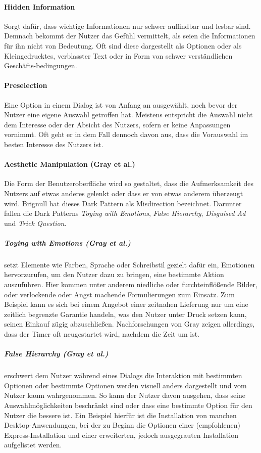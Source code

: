 \documentclass[a4paper]{article}
\newcommand{\todo}[1]{{\color{purple}{#1}}}
\begin{document}
\paragraph{Hidden Information}
Sorgt dafür, dass wichtige Informationen nur schwer auffindbar und lesbar sind. Demnach bekommt der Nutzer das Gefühl vermittelt, als seien die Informationen für ihn nicht von Bedeutung. Oft sind diese dargestellt als Optionen oder als Kleingedrucktes, verblasster Text oder in Form von schwer verständlichen Geschäfts-bedingungen.

\paragraph{Preselection}
Eine Option in einem Dialog ist von Anfang an ausgewählt, noch bevor der Nutzer eine eigene Auswahl getroffen hat. Meistens entspricht die Auswahl nicht dem Interesse oder der Absicht des Nutzers, sofern er keine Anpassungen vornimmt. Oft geht er in dem Fall dennoch davon aus, dass die Vorauswahl im besten Interesse des Nutzers ist. 
 
\paragraph{Aesthetic Manipulation (Gray et al.)}
Die Form der Benutzeroberfläche wird so gestaltet, dass die Aufmerksamkeit des Nutzers auf etwas anderes gelenkt oder dass er von etwas anderem überzeugt wird. Brignull hat dieses Dark Pattern als \glqq Misdirection\grqq{} bezeichnet. 
Darunter fallen die Dark Patterns \textit{Toying with Emotions}, \textit{False Hierarchy}, \textit{Disguised Ad} und \textit{Trick Question}.

\subparagraph{Toying with Emotions (Gray et al.)} 
setzt Elemente wie Farben, Sprache oder Schreibstil gezielt dafür ein, Emotionen hervorzurufen, um den Nutzer dazu zu bringen, eine bestimmte Aktion auszuführen. Hier kommen unter anderem niedliche \todo{zu viel oder XD} oder furchteinflößende Bilder, oder verlockende oder Angst machende Formulierungen zum Einsatz. Zum Beispiel kann es sich bei einem Angebot einer zeitnahen Lieferung nur um eine zeitlich begrenzte Garantie handeln, was den Nutzer unter Druck setzen kann, seinen Einkauf zügig abzuschließen. Nachforschungen von Gray zeigen allerdings, dass der Timer oft neugestartet wird, nachdem die Zeit um ist. 

\subparagraph{False Hierarchy (Gray et al.)}
erschwert dem Nutzer während eines Dialogs die Interaktion mit bestimmten Optionen oder bestimmte Optionen werden visuell anders dargestellt und vom Nutzer kaum wahrgenommen. So kann der Nutzer davon ausgehen, dass seine Auswahlmöglichkeiten beschränkt sind oder dass eine bestimmte Option für den Nutzer die bessere ist. Ein Beispiel hierfür ist die Installation von manchen Desktop-Anwendungen, bei der zu Beginn die Optionen einer (empfohlenen) Express-Installation und einer erweiterten, jedoch ausgegrauten Installation aufgelistet werden.
\end{document}
